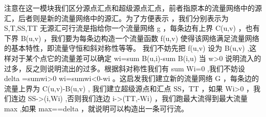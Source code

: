 \markdownRendererInterblockSeparator
{}注意在这一模块我们区分源点汇点和超级源点汇点，前者指原本的流量网络中的源汇，后者则是新的流量网络中的源汇。为了方便表示 ，我们分别表示为\markdownRendererDollarSign{} S,T,SS,TT\markdownRendererSoftLineBreak
{}\markdownRendererDollarSign{}\markdownRendererInterblockSeparator
{}\markdownRendererSectionBegin
{}\markdownRendererInterblockSeparator
{}无源汇可行流是指给你一个流量网络\markdownRendererDollarSign{} g \markdownRendererDollarSign{}，每条边有上界\markdownRendererDollarSign{} C(u,v) \markdownRendererDollarSign{}，也有下界\markdownRendererDollarSign{} B(u,v) \markdownRendererDollarSign{}，我们要为每条边构造一个流量函数\markdownRendererDollarSign{} f(u,v) \markdownRendererDollarSign{}使得该网络满足流量网络的基本特性，即流量守恒和斜对称性等等。\markdownRendererParagraphSeparator
{}我们不妨先把\markdownRendererDollarSign{} f(u,v) \markdownRendererDollarSign{}设为\markdownRendererDollarSign{} B(u,v) \markdownRendererDollarSign{},这样对于某个点它的流量差可以确定\markdownRendererDollarSign{} w\markdownRendererUnderscore{}i=\markdownRendererBackslash{}sum B(u,i)-\markdownRendererBackslash{}sum B(i,u) \markdownRendererDollarSign{}\markdownRendererParagraphSeparator
{}当\markdownRendererDollarSign{} w>0 \markdownRendererDollarSign{}说明流入的过多，反之则说明流出的过多。根据斜对称性我们有\markdownRendererDollarSign{} \markdownRendererBackslash{}sum W\markdownRendererUnderscore{}i=0 \markdownRendererDollarSign{},我们不妨设\markdownRendererDollarSign{} \markdownRendererBackslash{}delta =\markdownRendererBackslash{}sum\markdownRendererUnderscore{}\markdownRendererLeftBrace{}wi>0\markdownRendererRightBrace{} wi=\markdownRendererBackslash{}sum\markdownRendererUnderscore{}\markdownRendererLeftBrace{}wi<0\markdownRendererRightBrace{}-wi \markdownRendererDollarSign{}。这启发我们建立新的流量网络\markdownRendererDollarSign{} G \markdownRendererDollarSign{}，每条边的流量上界为\markdownRendererDollarSign{} C(u,v)-B(u,v) \markdownRendererDollarSign{},\markdownRendererParagraphSeparator
{}我们建立超级源点和汇点\markdownRendererDollarSign{} SS，TT\markdownRendererSoftLineBreak
{}\markdownRendererDollarSign{}，如果\markdownRendererDollarSign{} Wi>0 \markdownRendererDollarSign{}，我们连边\markdownRendererDollarSign{} SS->(i,Wi) \markdownRendererDollarSign{},否则我们连边\markdownRendererDollarSign{} i->(TT,-Wi) \markdownRendererDollarSign{}，我们跑最大流得到最大流量\markdownRendererDollarSign{} max\markdownRendererSoftLineBreak
{}\markdownRendererDollarSign{},如果\markdownRendererDollarSign{} max==\markdownRendererBackslash{}delta \markdownRendererDollarSign{}，就说明可以构造出一条可行流。\markdownRendererParagraphSeparator
